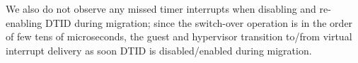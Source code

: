 We also do not observe any missed timer interrupts 
when disabling and re-enabling DTID  during migration;
since the switch-over operation is in the order of few tens of microseconds,
the guest and hypervisor transition to/from virtual interrupt delivery 
as soon DTID is disabled/enabled during migration.

